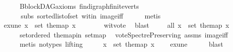 \begin{isabellebody}
\ \ \ \ \isamarkupfalse%
\ B{\isachardot}{\kern0pt}blockDAG{\isacharunderscore}{\kern0pt}axioms\ fin{\isacharunderscore}{\kern0pt}digraph{\isachardot}{\kern0pt}finite{\isacharunderscore}{\kern0pt}verts\ \isanewline
\ \ \ \ \ \ subs{\isacharparenleft}{\kern0pt}{}{\isacharparenright}{\kern0pt}\ sorted{\isacharunderscore}{\kern0pt}list{\isacharunderscore}{\kern0pt}of{\isacharunderscore}{\kern0pt}set{\isacharparenleft}{\kern0pt}{}{\isacharparenright}{\kern0pt}\ wit{\isacharunderscore}{\kern0pt}in\ image{\isacharunderscore}{\kern0pt}iff\isanewline
\ \ \ \ \isamarkupfalse%
\ metis\ \isanewline
\ \ \isamarkupfalse%
\ \isamarkupfalse%
\ exune{\isacharcolon}{\kern0pt}\ {\isachardoublequoteopen}{\isasymexists}x\ {\isasymin}\ set\ the{\isacharunderscore}{\kern0pt}map{\isachardot}{\kern0pt}\ x\ {\isasymnoteq}\ {}{\isachardoublequoteclose}\isanewline
\ \ \ \ \isamarkupfalse%
\ wit{\isacharunderscore}{\kern0pt}vote\ \isamarkupfalse%
\ blast\ \isanewline
\ \ \isamarkupfalse%
\ all{}{}{\isacharcolon}{\kern0pt}\ {\isachardoublequoteopen}{\isasymforall}x\ {\isasymin}\ set\ the{\isacharunderscore}{\kern0pt}map{\isachardot}{\kern0pt}\ x\ {\isasymin}\ {\isacharbraceleft}{\kern0pt}{}{\isacharcomma}{\kern0pt}{}{\isacharbraceright}{\kern0pt}{\isachardoublequoteclose}\ \isanewline
\ \ \ \ \isamarkupfalse%
\ set{\isacharunderscore}{\kern0pt}ordered\ the{\isacharunderscore}{\kern0pt}map{\isacharunderscore}{\kern0pt}in\ set{\isacharunderscore}{\kern0pt}map\ \isamarkupfalse%
\ vote{\isacharunderscore}{\kern0pt}Spectre{\isacharunderscore}{\kern0pt}Preserving\ assms{\isacharparenleft}{\kern0pt}{}{\isacharparenright}{\kern0pt}\ image{\isacharunderscore}{\kern0pt}iff\ \isanewline
\ \ \ \ \isamarkupfalse%
\ {\isacharparenleft}{\kern0pt}metis\ {\isacharparenleft}{\kern0pt}no{\isacharunderscore}{\kern0pt}types{\isacharcomma}{\kern0pt}\ lifting{\isacharparenright}{\kern0pt}{\isacharparenright}{\kern0pt}\isanewline
\ \ \isamarkupfalse%
\ \isamarkupfalse%
\ {\isachardoublequoteopen}{\isasymexists}x\ {\isasymin}\ set\ the{\isacharunderscore}{\kern0pt}map{\isachardot}{\kern0pt}\ x\ {\isacharequal}{\kern0pt}\ {}{\isachardoublequoteclose}\ \isamarkupfalse%
\ exune\isanewline
\ \ \ \ \isamarkupfalse%
\ blast\ \isanewline
\ \ \isamarkupfalse%

\end{isabellebody}
